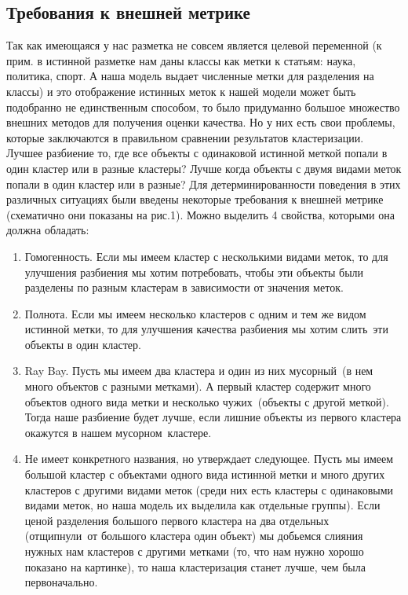 \documentclass[12pt,fleqn]{article}
\begin{document}
\subsection{Требования к внешней метрике}
Так как имеющаяся у нас разметка не совсем является целевой переменной (к прим. в истинной разметке нам даны классы как метки к статьям: наука, политика, спорт. А наша модель выдает численные метки для разделения на классы) и это отображение истинных меток к нашей модели может быть подобранно не единственным способом, то было придуманно большое множество внешних методов для получения оценки качества. Но у них есть свои проблемы, которые заключаются в правильном сравнении результатов кластеризации. Лучшее разбиение то, где все объекты с одинаковой истинной меткой попали в один кластер или в разные кластеры? Лучше когда объекты с двумя видами меток попали в один кластер или в разные? Для детерминированности поведения в этих различных ситуациях были введены некоторые требования к внешней метрике (схематично они показаны на рис.1). Можно выделить 4 свойства, которыми она должна обладать:

\begin{enumerate}
	\item Гомогенность. Если мы имеем кластер с несколькими видами меток, то для улучшения разбиения мы хотим потребовать, чтобы эти объекты были разделены по разным кластерам в зависимости от значения меток. 
	\item Полнота. Если мы имеем несколько кластеров с одним и тем же видом истинной метки, то для улучшения качества разбиения мы хотим \grqq слить\grqq~эти объекты в один кластер.
	\item Ray Bay. Пусть мы имеем два кластера и один из них \grqq мусорный\grqq~(в нем много объектов с разными метками). А первый кластер содержит много объектов одного вида метки и несколько \grqq чужих\grqq~(объекты с другой меткой). Тогда наше разбиение будет лучше, если лишние объекты из первого кластера окажутся в нашем \grqq мусорном\grqq~кластере.
	\item Не имеет конкретного названия, но утверждает следующее. Пусть мы имеем большой кластер с объектами одного вида истинной метки и много других кластеров с другими видами меток (среди них есть кластеры с одинаковыми видами меток, но наша модель их выделила как отдельные группы). Если ценой разделения большого первого кластера на два отдельных (\grqq отщипнули\grqq~от большого кластера один объект) мы добьемся слияния нужных нам кластеров с другими метками (то, что нам нужно хорошо показано на картинке), то наша кластеризация станет лучше, чем была первоначально.
\end{enumerate}
\end{document}
